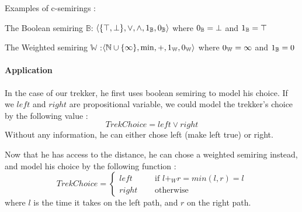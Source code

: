 \begin{example}
Examples of c-semirings :
\begin{list}{-}{}
	\item The Boolean semiring $\mathbb{B}$:	$\left\langle \{\top,\bot\}, \lor, \land, \boldmath{1}_{\mathbb{B}}, \boldmath{0}_{\mathbb{B}} \right\rangle$ where $\boldmath{0}_{\mathbb{B}}=\bot$ and $\boldmath{1}_{\mathbb{B}}=\top$
	
	\item The Weighted semiring $\mathbb{W}$ :$\left\langle \mathbb{N}\cup\{\infty\}, \min, +, \boldmath{1}_{\mathbb{W}}, \boldmath{0}_{\mathbb{W}} \right\rangle$ where $\boldmath{0}_{\mathbb{W}}=\infty$ and $\boldmath{1}_{\mathbb{B}}=0$	
\end{list}

\paragraph{Application}
In the case of our trekker, he first uses boolean semiring to model his choice. If we $left$ and $right$ are propositional variable, we could model the trekker's choice by the following value :
$$ 	TrekChoice = left \lor right $$
Without any information, he can either chose left (make left true) or right.

Now that he has access to the distance, he can chose a weighted semiring instead, and model his choice by the following function :
$$
	TrekChoice = 	\left\{
	\begin{array}{rl}
	left \quad & \text{ if } l+_Wr= min(l,r) = l \\
	right \quad & \text{ otherwise }
	\end{array}
	\right.
$$
where $l$ is the time it takes on the left path, and $r$ on the right path.
	
\end{example}

